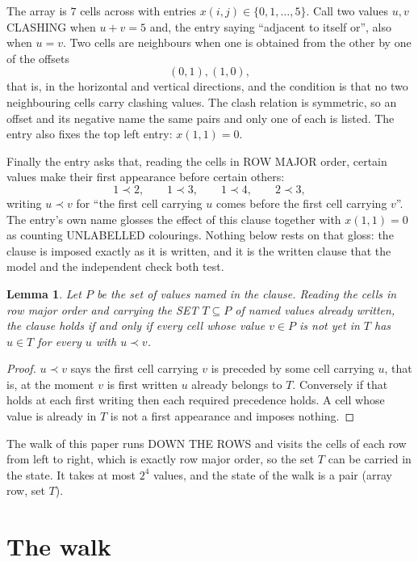 \documentclass[11pt,a4paper]{article}
\theoremstyle{plain}
\newtheorem{lemma}[theorem]{Lemma}
\theoremstyle{definition}
\begin{document}
The array is $7$ cells across with entries $x(i,j)\in\{0,1,\dots,5\}$. Call two values $u,v$ CLASHING
when $u+v=5$ and, the entry saying ``adjacent to itself or'', also when $u=v$. Two cells are neighbours when one is obtained from the other by one of
the offsets
\[
(0,1), (1,0),
\]
that is, in the horizontal and vertical directions, and the condition is that no two neighbouring cells carry
clashing values. The clash relation is symmetric, so an offset and its negative name the
same pairs and only one of each is listed. The entry also fixes the top left entry: $x(1,1)=0$.

Finally the entry asks that, reading the cells in ROW MAJOR order, certain values make their
first appearance before certain others:
\[
1\prec 2,\qquad 1\prec 3,\qquad 1\prec 4,\qquad 2\prec 3 ,
\]
writing $u\prec v$ for ``the first cell carrying $u$ comes before the first cell carrying
$v$''. The entry's own name glosses the effect of this clause together with $x(1,1)=0$ as
counting UNLABELLED colourings. Nothing below rests on that gloss: the clause is imposed
exactly as it is written, and it is the written clause that the model and the independent
check both test.

\begin{lemma}\label{lem:seen}
Let $P$ be the set of values named in the clause. Reading the cells in row major order and
carrying the SET $T\subseteq P$ of named values already written, the clause holds if and only
if every cell whose value $v\in P$ is not yet in $T$ has $u\in T$ for every $u$ with $u\prec v$.
\end{lemma}

\begin{proof}
$u\prec v$ says the first cell carrying $v$ is preceded by some cell carrying $u$, that is, at
the moment $v$ is first written $u$ already belongs to $T$. Conversely if that holds at each
first writing then each required precedence holds. A cell whose value is already in $T$ is not
a first appearance and imposes nothing.
\end{proof}

The walk of this paper runs DOWN THE ROWS and visits the cells of each row from left to right,
which is exactly row major order, so the set $T$ can be carried in the state. It takes at most
$2^{4}$ values, and the state of the walk is a pair (array row, set $T$).

\section{The walk}
\end{document}
